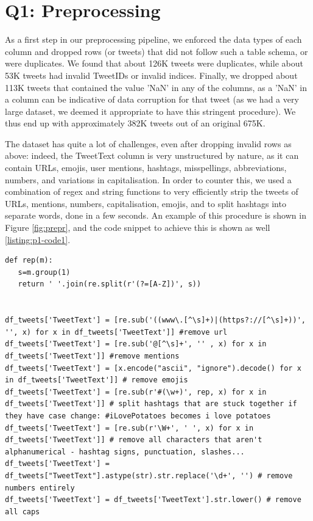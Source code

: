 \section*{Q1: Preprocessing}
As a first step in our preprocessing pipeline, we enforced the data types of each column and dropped rows (or tweets) that did not follow such a table schema, or were duplicates. We found that about 126K tweets were duplicates, while about 53K tweets had invalid TweetIDs or invalid indices. Finally, we dropped about 113K tweets that contained the value 'NaN' in any of the columns, as a 'NaN' in a column can be indicative of data corruption for that tweet (as we had a very large dataset, we deemed it appropriate to have this stringent procedure). We thus end up with approximately 382K tweets out of an original 675K.

The dataset has quite a lot of challenges, even after dropping invalid rows as above: indeed, the TweetText column is very unstructured by nature, as it can contain URLs, emojis, user mentions, hashtags, misspellings, abbreviations, numbers, and variations in capitalisation. In order to counter this, we used a combination of regex and string functions to very efficiently strip the tweets of URLs, mentions, numbers, capitalisation, emojis, and to split hashtags into separate words, done in a few seconds. An example of this procedure is shown in Figure \ref{fig:prepr}, and the code snippet to achieve this is shown as well \cref{listing:p1-code1}.


\begin{listing*}[t]
\begin{verbatim}
def rep(m):
   s=m.group(1)
   return ' '.join(re.split(r'(?=[A-Z])', s))


df_tweets['TweetText'] = [re.sub('((www\.[^\s]+)|(https?://[^\s]+))', '', x) for x in df_tweets['TweetText']] #remove url
df_tweets['TweetText'] = [re.sub('@[^\s]+', '' , x) for x in df_tweets['TweetText']] #remove mentions
df_tweets['TweetText'] = [x.encode("ascii", "ignore").decode() for x in df_tweets['TweetText']] # remove emojis
df_tweets['TweetText'] = [re.sub(r'#(\w+)', rep, x) for x in df_tweets['TweetText']] # split hashtags that are stuck together if they have case change: #iLovePotatoes becomes i love potatoes
df_tweets['TweetText'] = [re.sub(r'\W+', ' ', x) for x in df_tweets['TweetText']] # remove all characters that aren't alphanumerical - hashtag signs, punctuation, slashes...
df_tweets['TweetText'] = df_tweets["TweetText"].astype(str).str.replace('\d+', '') # remove numbers entirely
df_tweets['TweetText'] = df_tweets['TweetText'].str.lower() # remove all caps
\end{verbatim}
\caption{}
\label{listing:p1-code1}
\end{listing*}

